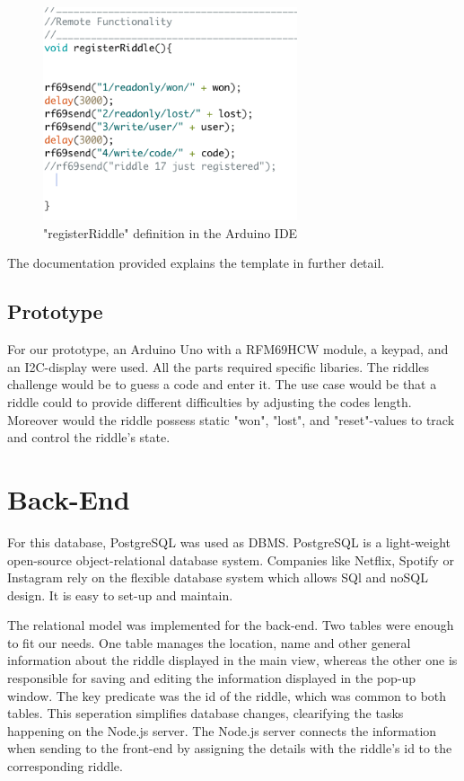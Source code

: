 


\begin{figure}[th]
	\centering
	\includegraphics[width=75mm,scale=0.75]{Figures/registerRiddle}
	\decoRule
	\caption[registerRiddle]{"registerRiddle" definition in the Arduino IDE}
	\label{fig:registerRiddle}
\end{figure}


The documentation provided explains the template in further detail.

\subsection{Prototype}

For our prototype, an Arduino Uno with a RFM69HCW module, a keypad, and an I2C-display were used.
All the parts required specific libaries.
The riddles challenge would be to guess a code and enter it.
The use case would be that a riddle could to provide different difficulties by adjusting the codes length.
Moreover would the riddle possess static  "won", "lost", and "reset"-values to track and control the riddle's state.

\section{Back-End}

For this database, PostgreSQL was used as DBMS.
PostgreSQL is a light-weight open-source object-relational database system. 
Companies like Netflix, Spotify or Instagram \parencite{postgresUsers} rely on the flexible database system which allows SQl and noSQL design.
It is easy to set-up and maintain. 

The relational model was implemented for the back-end.
Two tables were enough to fit our needs.
One table manages the location, name and other general information about the riddle displayed in the main view,
whereas the other one is responsible for saving and editing the information displayed in the pop-up window.
The key predicate was the id of the riddle, which was common to both tables.
This seperation simplifies database changes, clearifying the tasks happening on the Node.js server.
The Node.js server connects the information when sending to the front-end by assigning the details with the riddle's id to the corresponding riddle.

